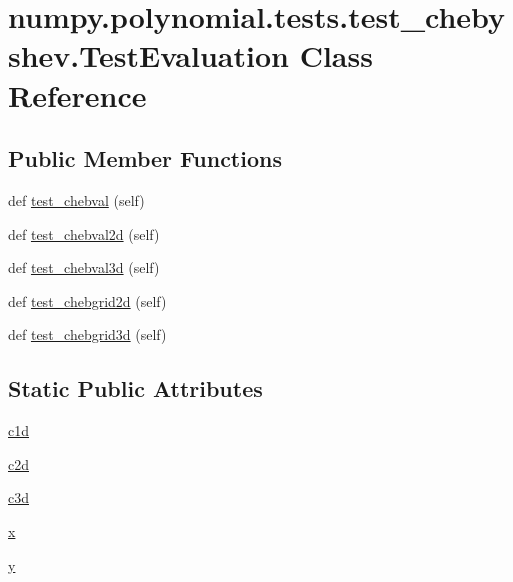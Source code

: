 \hypertarget{classnumpy_1_1polynomial_1_1tests_1_1test__chebyshev_1_1TestEvaluation}{}\section{numpy.\+polynomial.\+tests.\+test\+\_\+chebyshev.\+Test\+Evaluation Class Reference}
\label{classnumpy_1_1polynomial_1_1tests_1_1test__chebyshev_1_1TestEvaluation}
\subsection*{Public Member Functions}
\begin{DoxyCompactItemize}
\item 
def \hyperlink{classnumpy_1_1polynomial_1_1tests_1_1test__chebyshev_1_1TestEvaluation_a949efa899a753d4950d10a98cb5e4678}{test\+\_\+chebval} (self)
\item 
def \hyperlink{classnumpy_1_1polynomial_1_1tests_1_1test__chebyshev_1_1TestEvaluation_a7a1ed901e330390c513e1a18b1ff285b}{test\+\_\+chebval2d} (self)
\item 
def \hyperlink{classnumpy_1_1polynomial_1_1tests_1_1test__chebyshev_1_1TestEvaluation_a52d015fa4d1e4c7cd7540082d35f09b2}{test\+\_\+chebval3d} (self)
\item 
def \hyperlink{classnumpy_1_1polynomial_1_1tests_1_1test__chebyshev_1_1TestEvaluation_a025ac4ea1f08a33fa674931efd5ed5ee}{test\+\_\+chebgrid2d} (self)
\item 
def \hyperlink{classnumpy_1_1polynomial_1_1tests_1_1test__chebyshev_1_1TestEvaluation_a8386ab18d19ee9ad4efd9fe9a4f7b8ff}{test\+\_\+chebgrid3d} (self)
\end{DoxyCompactItemize}
\subsection*{Static Public Attributes}
\begin{DoxyCompactItemize}
\item 
\hyperlink{classnumpy_1_1polynomial_1_1tests_1_1test__chebyshev_1_1TestEvaluation_a86babc47cf8453c574838705164e03ed}{c1d}
\item 
\hyperlink{classnumpy_1_1polynomial_1_1tests_1_1test__chebyshev_1_1TestEvaluation_a94a27f3d8693caf480dc5c4f01d8f243}{c2d}
\item 
\hyperlink{classnumpy_1_1polynomial_1_1tests_1_1test__chebyshev_1_1TestEvaluation_ad56e50b2124004118b4e5f69fd2e0303}{c3d}
\item 
\hyperlink{classnumpy_1_1polynomial_1_1tests_1_1test__chebyshev_1_1TestEvaluation_a74a925581d20cfa8a45ed6be450a0bbe}{x}
\item 
\hyperlink{classnumpy_1_1polynomial_1_1tests_1_1test__chebyshev_1_1TestEvaluation_ae1809901c8315d5f6b6d8ddd88caddcd}{y}
\end{DoxyCompactItemize}


